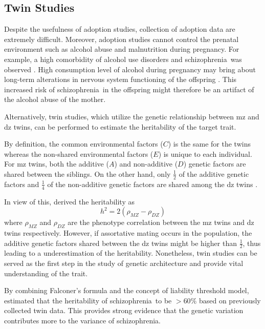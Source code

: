 \documentclass[12pt]{scrbook}
\newcommand*{\scz}{schizophrenia}
\begin{document}
\subsection{Twin Studies}
Despite the usefulness of adoption studies, collection of adoption data are extremely difficult. 
Moreover, adoption studies cannot control the prenatal environment such as alcohol abuse and malnutrition during pregnancy.
For example, a high comorbidity of alcohol use disorders and \scz\ was observed \citep{boyd1984,drake1990}. 
High consumption level of alcohol during pregnancy may bring about long-term alterations in nervous system functioning of the offspring \citep{garrett2014brain}.
This increased risk of \scz\ in the offspring might therefore be an artifact of the alcohol abuse of the mother. 

Alternatively, twin studies, which utilize the genetic relationship between \gls{mz} and \gls{dz} twins, can be performed to estimate the heritability of the target trait.

By definition, the common environmental factors ($C$) is the same for the twins whereas the non-shared environmental factors ($E$) is unique to each individual.
For \gls{mz} twins, both the additive ($A$) and non-additive ($D$) genetic factors are shared between the siblings. 
On the other hand, only $\frac{1}{2}$ of the additive genetic factors and $\frac{1}{4}$ of the non-additive genetic factors are shared among the \gls{dz} twins \citep{rijsdijk2002analytic}.

In view of this, \citet{falconer1996introduction} derived the heritability as
\begin{equation}
h^2 = 2(\rho_{MZ}-\rho_{DZ})
\end{equation}
where $\rho_{MZ}$ and $\rho_{DZ}$ are the phenotype correlation between the \gls{mz} twins and \gls{dz} twins respectively.
However, if assortative mating occurs in the population, the additive genetic factors shared between the \gls{dz} twins might be higher than $\frac{1}{2}$, thus leading to a underestimation of the heritability.
Nonetheless, twin studies can be served as the first step in the study of genetic architecture and provide vital understanding of the trait.

By combining Falconer's formula and the concept of liability threshold model, \citet{Gottesman1967} estimated that the heritability of \scz\ to be $>60\%$ based on previously collected twin data.
This provides strong evidence that the genetic variation contributes more to the variance of \scz.
\end{document}
